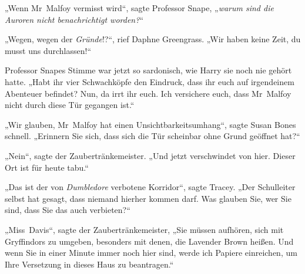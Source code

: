 „Wenn Mr~Malfoy vermisst wird“, sagte Professor Snape, „\emph{warum sind die Auroren nicht benachrichtigt worden?}“

„Wegen, wegen der \emph{Gründe}!?“, rief Daphne Greengrass. „Wir haben keine Zeit, du musst uns durchlassen!“

Professor Snapes Stimme war jetzt so sardonisch, wie Harry sie noch nie gehört hatte.
„Habt ihr vier Schwachköpfe den Eindruck, dass ihr euch auf irgendeinem Abenteuer befindet? Nun, da irrt ihr euch. Ich versichere euch, dass Mr~Malfoy nicht durch diese Tür gegangen ist.“

„Wir glauben, Mr~Malfoy hat einen Unsichtbarkeitsumhang“, sagte Susan Bones schnell. „Erinnern Sie sich, dass sich die Tür scheinbar ohne Grund geöffnet hat?“

„Nein“, sagte der Zaubertränkemeister. „Und jetzt verschwindet von hier. Dieser Ort ist für heute tabu.“

„Das ist der von \emph{Dumbledore} verbotene Korridor“, sagte Tracey. „Der Schulleiter selbst hat gesagt, dass niemand hierher kommen darf. Was glauben Sie, wer Sie sind, dass Sie das auch verbieten?“

„Miss~Davis“, sagte der Zaubertränkemeister, „Sie müssen aufhören, sich mit Gryffindors zu umgeben, besonders mit denen, die Lavender Brown heißen. Und wenn Sie in einer Minute immer noch hier sind, werde ich Papiere einreichen, um Ihre Versetzung in dieses Haus zu beantragen.“

